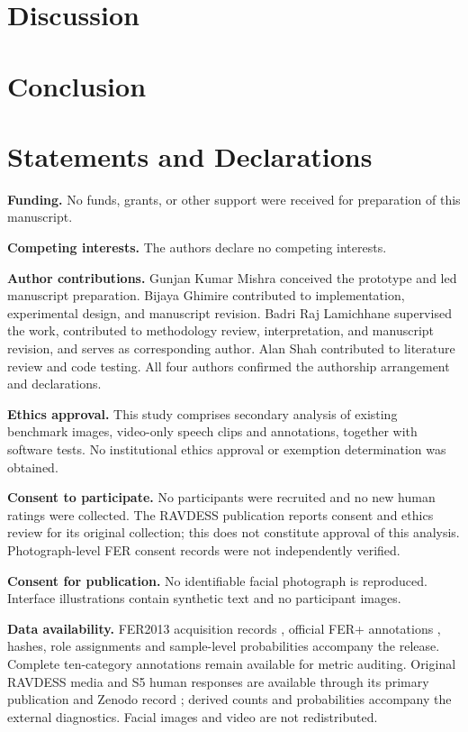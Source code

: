 \documentclass[pdflatex,sn-mathphys-num]{sn-jnl}
\begin{document}
\section{Discussion}


\section{Conclusion}


\backmatter
\section*{Statements and Declarations}
\noindent\textbf{Funding.} No funds, grants, or other support were received for preparation of this manuscript.

\noindent\textbf{Competing interests.} The authors declare no competing interests.

\noindent\textbf{Author contributions.} Gunjan Kumar Mishra conceived the prototype and led manuscript preparation. Bijaya Ghimire contributed to implementation, experimental design, and manuscript revision. Badri Raj Lamichhane supervised the work, contributed to methodology review, interpretation, and manuscript revision, and serves as corresponding author. Alan Shah contributed to literature review and code testing. All four authors confirmed the authorship arrangement and declarations.

\noindent\textbf{Ethics approval.} This study comprises secondary analysis of existing benchmark images, video-only speech clips and annotations, together with software tests. No institutional ethics approval or exemption determination was obtained.

\noindent\textbf{Consent to participate.} No participants were recruited and no new human ratings were collected. The RAVDESS publication reports consent and ethics review for its original collection; this does not constitute approval of this analysis. Photograph-level FER consent records were not independently verified.

\noindent\textbf{Consent for publication.} No identifiable facial photograph is reproduced. Interface illustrations contain synthetic text and no participant images.

\noindent\textbf{Data availability.} FER2013 acquisition records \cite{goodfellow2013fer}, official FER+ annotations \cite{barsoum2016ferplus}, hashes, role assignments and sample-level probabilities accompany the release. Complete ten-category annotations remain available for metric auditing. Original RAVDESS media and S5 human responses are available through its primary publication and Zenodo record \cite{livingstone2018ravdess}; derived counts and probabilities accompany the external diagnostics. Facial images and video are not redistributed.
\end{document}

